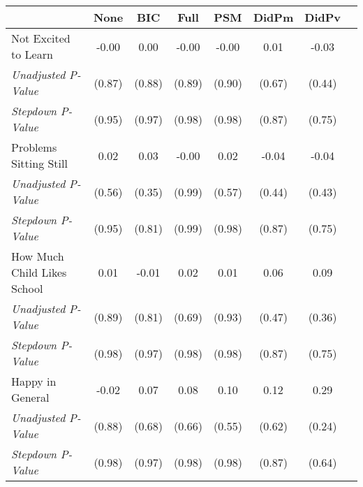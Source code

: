 \begin{tabular}{l c c c c c c c}
\toprule
 & None & BIC & Full & PSM & DidPm & DidPv \\
\midrule
Not Excited to Learn & -0.00 & 0.00 & -0.00 & -0.00 & 0.01 & -0.03 \\
\quad \textit{Unadjusted P-Value} & (0.87) & (0.88) & (0.89) & (0.90) & (0.67) & (0.44) \\
\quad \textit{Stepdown P-Value} & (0.95) & (0.97) & (0.98) & (0.98) & (0.87) & (0.75) \\
Problems Sitting Still & 0.02 & 0.03 & -0.00 & 0.02 & -0.04 & -0.04 \\
\quad \textit{Unadjusted P-Value} & (0.56) & (0.35) & (0.99) & (0.57) & (0.44) & (0.43) \\
\quad \textit{Stepdown P-Value} & (0.95) & (0.81) & (0.99) & (0.98) & (0.87) & (0.75) \\
How Much Child Likes School & 0.01 & -0.01 & 0.02 & 0.01 & 0.06 & 0.09 \\
\quad \textit{Unadjusted P-Value} & (0.89) & (0.81) & (0.69) & (0.93) & (0.47) & (0.36) \\
\quad \textit{Stepdown P-Value} & (0.98) & (0.97) & (0.98) & (0.98) & (0.87) & (0.75) \\
Happy in General & -0.02 & 0.07 & 0.08 & 0.10 & 0.12 & 0.29 \\
\quad \textit{Unadjusted P-Value} & (0.88) & (0.68) & (0.66) & (0.55) & (0.62) & (0.24) \\
\quad \textit{Stepdown P-Value} & (0.98) & (0.97) & (0.98) & (0.98) & (0.87) & (0.64) \\
\bottomrule
\end{tabular}
